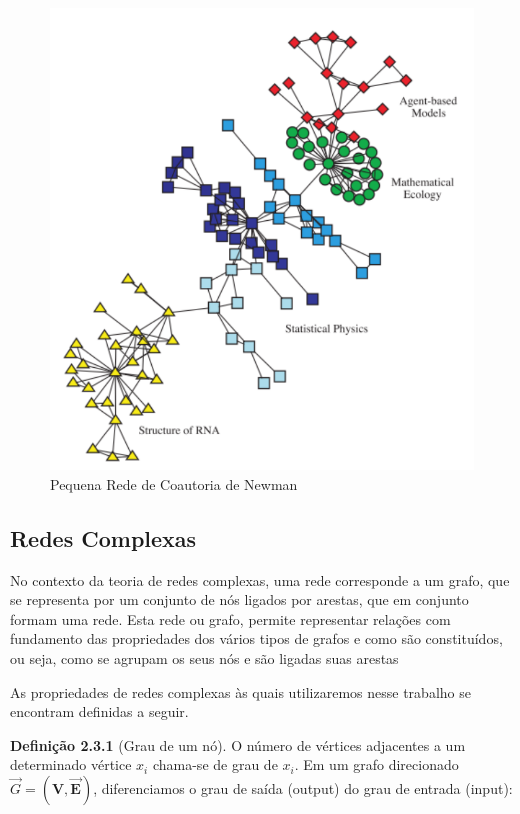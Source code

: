 \documentclass[12pt]{article}
\begin{document}
\begin{figure}[H]
\centering
\includegraphics[scale=0.6]{images/rede-newman.pdf}
\caption{Pequena Rede de Coautoria de Newman}
\label{rede1}
\end{figure}


\subsection{Redes Complexas}

No contexto da teoria de redes complexas, uma rede corresponde a um grafo, que se representa por um conjunto de nós ligados por arestas, que em conjunto formam uma rede.  Esta rede ou grafo, permite representar relações com fundamento das propriedades dos vários tipos de grafos e como são constituídos, ou seja, como se agrupam os seus nós e são ligadas suas arestas %

As propriedades de redes complexas às quais utilizaremos nesse trabalho se encontram definidas a seguir.

\noindent \textbf{Definição 2.3.1} (Grau de um nó). O número de vértices adjacentes a um determinado vértice $x_i$ chama-se de grau de $x_i$. Em um grafo direcionado $\Vec G = (\bm V,\bm \Vec E)$, diferenciamos o grau de saída (output) do grau de entrada (input):
\end{document}
